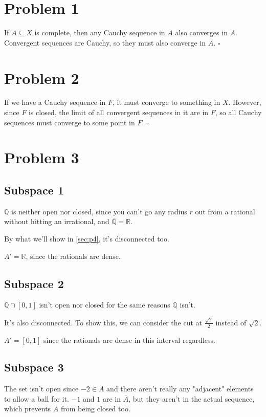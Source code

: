 \documentclass[12pt]{article}
\newcommand{\R}{\mathbb{R}}
\newcommand{\Q}{\mathbb{Q}}
\begin{document}
\section{Problem 1}

If $A \subseteq X$ is complete, then any Cauchy sequence in $A$ also converges in $A$.
Convergent sequences are Cauchy, so they must also converge in $A$. $\square$

\section{Problem 2}

If we have a Cauchy sequence in $F$, it must converge to something in $X$.
However, since $F$ is closed, the limit of all convergent sequences in it are in $F$,
so all Cauchy sequences must converge to some point in $F$. $\square$

\section{Problem 3}

\subsection{Subspace 1}

$\Q$ is neither open nor closed, since you can't go any radius $r$
out from a rational without hitting an irrational, and $\overline{\Q}=\R$.

By what we'll show in \ref{sec:p4}, it's disconnected too.

$A'=\R$, since the rationals are dense.

\subsection{Subspace 2}

$\Q \cap [0, 1]$ isn't open nor closed for the same reasons $\Q$ isn't.

It's also disconnected.
To show this, we can consider the cut at $\frac{\sqrt{2}}{2}$ instead of $\sqrt{2}$.

$A'=[0, 1]$ since the rationals are dense in this interval regardless.

\subsection{Subspace 3}

The set isn't open since $-2 \in A$ and there aren't really any "adjacent" elements to allow a ball for it.
$-1$ and $1$ are in $\overline{A}$, but they aren't in the actual sequence,
which prevents $A$ from being closed too.
\end{document}
